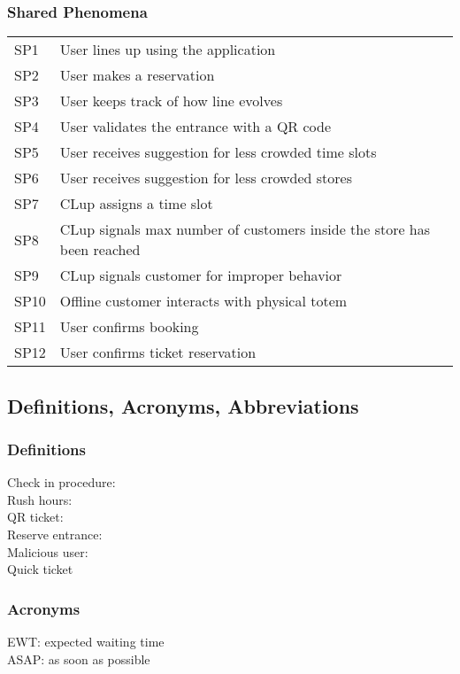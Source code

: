\subsubsection{\sffamily Shared Phenomena}
\begin{tabular}{l|l}
	SP1 & User lines up using the application \\
	SP2 & User makes a reservation \\
	SP3 & User keeps track of how line evolves \\
	SP4 & User validates the entrance with a QR code \\
	SP5 & User receives suggestion for less crowded time slots \\
	SP6 & User receives suggestion for less crowded stores \\
	SP7 & CLup assigns a time slot \\
	SP8 & CLup signals max number of customers inside the store has been reached \\
	SP9 & CLup signals customer for improper behavior \\
	SP10 & Offline customer interacts with physical totem \\
	SP11 & User confirms booking \\
	SP12 & User confirms ticket reservation \\
	
\end{tabular}

\subsection{\sffamily Definitions, Acronyms, Abbreviations}

\subsubsection{\sffamily Definitions}
Check in procedure:\\
Rush hours:\\
QR ticket:\\
Reserve entrance:\\
Malicious user:\\
Quick ticket

\subsubsection{\sffamily Acronyms}
EWT: expected waiting time\\
ASAP: as soon as possible\\
